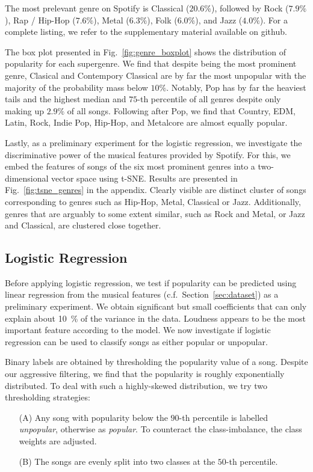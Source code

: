 \documentclass{article}
\begin{document}
The most prelevant genre on Spotify is Classical ($20.6\%$), followed by Rock ($7.9\%$), Rap / Hip-Hop ($7.6\%$), Metal ($6.3\%$), Folk ($6.0\%$), and Jazz ($4.0\%$). For a complete listing, we refer to the supplementary material available on github\footnotemark[5].

The box plot presented in Fig.~\ref{fig:genre_boxplot} shows the distribution of popularity for each supergenre. We find that despite  being the most prominent genre, Clasical and Contempory Classical are by far the most unpopular with the majority of the probability mass below $10\%$. Notably, Pop has by far the heaviest tails and the highest median and $75$-th percentile of all genres despite only making up $2.9\%$ of all songs. Following after Pop, we find that Country, EDM, Latin, Rock, Indie Pop, Hip-Hop, and Metalcore are almost equally popular.

Lastly, as a preliminary experiment for the logistic regression, we investigate the discriminative power of the musical features provided by Spotify. For this, we embed the features of songs of the six most prominent genres into a two-dimensional vector space using t-SNE. Results are presented in Fig.~\ref{fig:tsne_genres} in the appendix. Clearly visible are distinct cluster of songs corresponding to genres such as Hip-Hop, Metal, Classical or Jazz. Additionally, genres that are arguably to some extent similar, such as Rock and Metal, or Jazz and Classical, are clustered close together.

\subsection{Logistic Regression}
Before applying logistic regression, we test if popularity can be predicted using linear regression from the musical features (c.f.~Section~\ref{sec:dataset}) as a preliminary experiment. We obtain significant but small coefficients that can only explain about \SI{10}{\percent} of the variance in the data. Loudness appears to be the most important feature according to the model. We now investigate if logistic regression can be used to classify songs as either popular or unpopular. 

Binary labels are obtained by thresholding the popularity value of a song. Despite our aggressive filtering, we find that the popularity is roughly exponentially distributed. To deal with such a highly-skewed distribution, we try two thresholding strategies:
\begin{enumerate}
  \item[(A)] Any song with popularity below the $90$-th percentile is labelled \emph{unpopular}, otherwise as \emph{popular}. To counteract the class-imbalance, the class weights are adjusted.
  \item[(B)] The songs are evenly split into two classes at the $50$-th percentile.
\end{enumerate}
\end{document}
